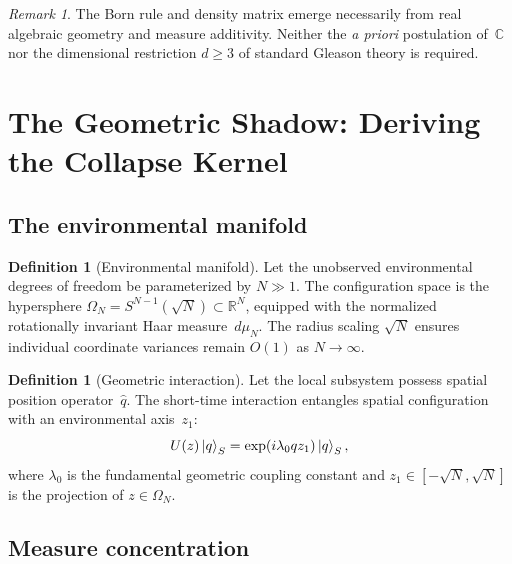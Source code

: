 \documentclass[aps,prd,twocolumn,superscriptaddress,nofootinbib]{revtex4-2}
\theoremstyle{definition}
\newtheorem{definition}[theorem]{Definition}
\theoremstyle{remark}
\newtheorem*{remark}{Remark}
\newcommand{\R}{\mathbb{R}}
\newcommand{\C}{\mathbb{C}}
\begin{document}
\begin{remark}
The Born rule and density matrix emerge necessarily from real algebraic
geometry and measure additivity. Neither the \textit{a priori} postulation
of~$\C$ nor the dimensional restriction $d \geq 3$ of standard Gleason
theory is required.
\end{remark}


\section{The Geometric Shadow: Deriving the Collapse Kernel}
\label{sec:geometric_shadow}

\subsection{The environmental manifold}

\begin{definition}[Environmental manifold]
\label{def:env_manifold}
Let the unobserved environmental degrees of freedom be parameterized by
$N \gg 1$. The configuration space is the hypersphere
$\Omega_N = S^{N-1}(\sqrt{N}) \subset \R^N$, equipped with the normalized
rotationally invariant Haar measure~$d\mu_N$. The radius scaling
$\sqrt{N}$ ensures individual coordinate variances remain $O(1)$ as
$N \to \infty$.
\end{definition}

\begin{definition}[Geometric interaction]
\label{def:geometric_interaction}
Let the local subsystem possess spatial position operator~$\hat{q}$. The
short-time interaction entangles spatial configuration with an
environmental axis~$z_1$:
\begin{equation}
U(z) \ket{q}_S = \exp(i\lambda_0 q z_1) \ket{q}_S,
\label{eq:interaction}
\end{equation}
where $\lambda_0$ is the fundamental geometric coupling constant and
$z_1 \in [-\sqrt{N}, \sqrt{N}]$ is the projection of $z \in \Omega_N$.
\end{definition}

\subsection{Measure concentration}
\end{document}
